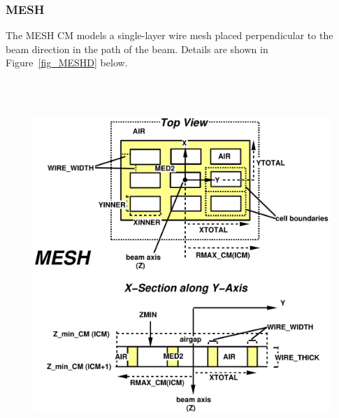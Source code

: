 \documentclass[12pt,twoside]{article}
\begin{document}
\clearpage

\vspace*{-2cm}
\renewcommand{\rightmark}{MESH CM}
\subsubsection{MESH}
The MESH CM models a single-layer wire mesh placed perpendicular
to the beam direction in the path of the beam.  Details are shown in
Figure~\ref{fig_MESHD} below.
\begin{figure}[H]
\begin{center}
\leavevmode
\begin{latexonly}
\includegraphics[height=14cm]{figures/meshd}
\end{latexonly}
\begin{htmlonly}

\end{htmlonly}
\end{center}
\end{figure}
\end{document}
